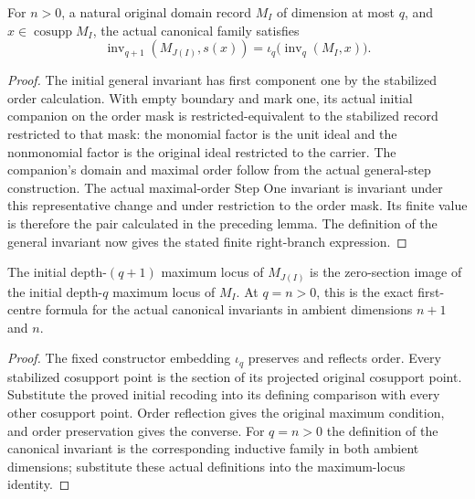 \begin{theorem}
\label{hir:disjoint-coherent-normal-initial-value}
\leanok
For $n>0$, a natural original domain record $M_I$ of dimension at most $q$,
and $x\in\operatorname{cosupp}M_I$, the actual canonical family satisfies
\[
 \operatorname{inv}_{q+1}(M_{J(I)},s(x))
 =\iota_q\bigl(\operatorname{inv}_q(M_I,x)\bigr).
\]
\end{theorem}
\begin{proof}
The initial general invariant has first component one by the stabilized
order calculation. With empty boundary and mark one, its actual initial
companion on the order mask is restricted-equivalent to the stabilized
record restricted to that mask: the monomial factor is the unit ideal
and the nonmonomial factor is the original ideal restricted to the
carrier. The companion's domain and maximal order follow from the actual
general-step construction. The actual maximal-order Step One invariant
is invariant under this representative change and under restriction to
the order mask. Its finite value is therefore the pair calculated in the
preceding lemma. The definition of the general invariant now gives the
stated finite right-branch expression.
\end{proof}

\begin{theorem}
\label{hir:disjoint-coherent-normal-initial-centre}
\leanok
The initial depth-$(q+1)$ maximum locus of $M_{J(I)}$ is the zero-section
image of the initial depth-$q$ maximum locus of $M_I$. At $q=n>0$, this
is the exact first-centre formula for the actual canonical invariants in
ambient dimensions $n+1$ and $n$.
\end{theorem}
\begin{proof}
The fixed constructor embedding $\iota_q$ preserves and reflects order.
Every stabilized cosupport point is the section of its projected original
cosupport point. Substitute the proved initial recoding into its defining
comparison with every other cosupport point. Order reflection gives the
original maximum condition, and order preservation gives the converse.
For $q=n>0$ the definition of the canonical invariant is the corresponding
inductive family in both ambient dimensions; substitute these actual
definitions into the maximum-locus identity.
\end{proof}

